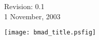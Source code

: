 \thispagestyle{empty}

\begin{flushright}
\large
  Revision: 0.1 \\
  1 November, 2003
\end{flushright}

\vfill

{
\begin{center}
\texttt{[image: bmad\_title.psfig]} \\
\end{center}
}

\vskip 1in
\vfill
\break